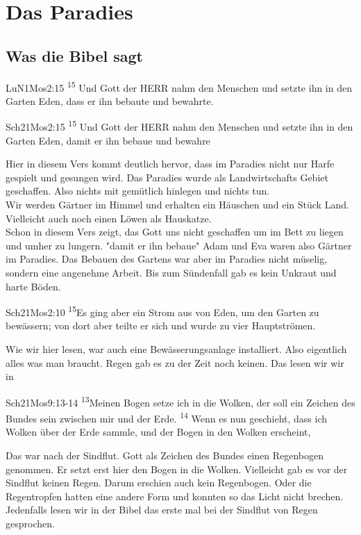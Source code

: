 \section{Das Paradies}
\subsection {Was die Bibel sagt}
\begin{bibeltext}{LuN}{1Mos}{2:15}
	\textsuperscript{15} Und Gott der HERR nahm den Menschen und setzte ihn in den Garten Eden, dass er ihn bebaute und bewahrte.
\end{bibeltext}

\begin{bibeltext}{Sch2}{1Mos}{2:15}
	\textsuperscript{15} Und Gott der HERR nahm den Menschen und setzte ihn in den Garten Eden, damit er ihn bebaue und bewahre
\end{bibeltext}

Hier in diesem Vers kommt deutlich hervor, dass im Paradies nicht nur Harfe gespielt und gesungen wird. Das Paradies wurde als Landwirtschafts Gebiet geschaffen. Also nichts mit gemütlich hinlegen und nichts tun.\\
Wir werden Gärtner im Himmel und erhalten ein Häuschen und ein Stück Land. Vielleicht auch noch einen Löwen als Hauskatze.\\
Schon in diesem Vers zeigt, das Gott uns nicht geschaffen um im Bett zu liegen und umher zu lungern. "damit er ihn bebaue" Adam und Eva waren also Gärtner im Paradies. Das Bebauen des Gartens war aber im Paradies nicht müselig, sondern eine angenehme Arbeit. Bis zum Sündenfall gab es kein Unkraut und harte Böden.
\begin{bibeltext}{Sch2}{1Mos}{2:10}
    \textsuperscript{15}Es ging aber ein Strom aus von Eden, um den Garten zu bewässern; von dort aber teilte er sich und wurde zu vier Hauptströmen.
\end{bibeltext}
Wie wir hier lesen, war auch eine Bewässerungsanlage installiert. Also eigentlich alles was man braucht. Regen gab es zu der Zeit noch keinen. Das lesen wir wir in
\begin{bibeltext}{Sch2}{1Mos}{9:13-14}
    \textsuperscript{13}Meinen Bogen setze ich in die Wolken, der soll ein Zeichen des Bundes sein zwischen mir und der Erde.
    \textsuperscript{14} Wenn es nun geschieht, dass ich Wolken über der Erde sammle, und der Bogen in den Wolken erscheint,
\end{bibeltext}
Das war nach der Sindflut. Gott als Zeichen des Bundes einen Regenbogen genommen. Er setzt erst hier den Bogen in die Wolken. Vielleicht gab es vor der Sindflut keinen Regen. Darum erschien auch kein Regenbogen. Oder die Regentropfen hatten eine andere Form und konnten so das Licht nicht brechen. Jedenfalls lesen wir in der Bibel das erste mal bei der Sindflut von Regen gesprochen.
